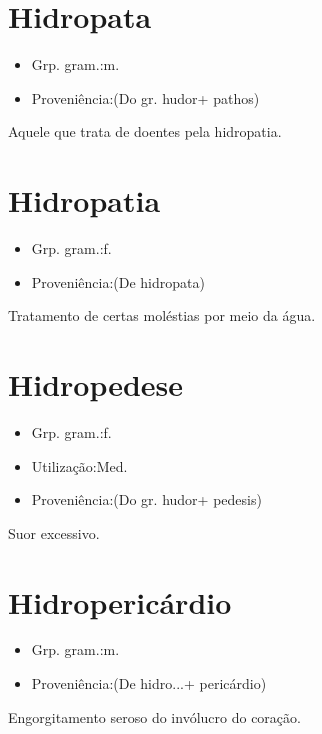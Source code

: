 \documentclass{article}
\begin{document}
\section{Hidropata}
\begin{itemize}
\item {Grp. gram.:m.}
\end{itemize}
\begin{itemize}
\item {Proveniência:(Do gr. \textunderscore hudor\textunderscore  + \textunderscore pathos\textunderscore )}
\end{itemize}
Aquele que trata de doentes pela hidropatia.
\section{Hidropatia}
\begin{itemize}
\item {Grp. gram.:f.}
\end{itemize}
\begin{itemize}
\item {Proveniência:(De \textunderscore hidropata\textunderscore )}
\end{itemize}
Tratamento de certas moléstias por meio da água.
\section{Hidropedese}
\begin{itemize}
\item {Grp. gram.:f.}
\end{itemize}
\begin{itemize}
\item {Utilização:Med.}
\end{itemize}
\begin{itemize}
\item {Proveniência:(Do gr. \textunderscore hudor\textunderscore  + \textunderscore pedesis\textunderscore )}
\end{itemize}
Suor excessivo.
\section{Hidropericárdio}
\begin{itemize}
\item {Grp. gram.:m.}
\end{itemize}
\begin{itemize}
\item {Proveniência:(De \textunderscore hidro...\textunderscore  + \textunderscore pericárdio\textunderscore )}
\end{itemize}
Engorgitamento seroso do invólucro do coração.
\end{document}
